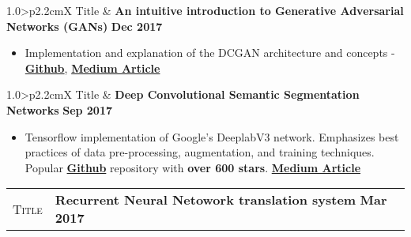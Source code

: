 \documentclass[9pt, a4paper, oneside, final]{scrartcl} %
\newcommand{\gray}{\rowcolor[gray]{.90}} %
\begin{document}

\begin{center}
\begin{tabularx}{1.0\linewidth}{>{\raggedleft\scshape}p{2.2cm}X}
\gray Title & \textbf{An intuitive introduction to Generative Adversarial Networks (GANs)} \hfill \textbf{Dec 2017}\\
\end{tabularx}
\end{center}


\begin{itemize}\itemsep1.2pt \parskip0pt 
\item Implementation and explanation of the DCGAN architecture and concepts - \textbf{\href{https://github.com/sthalles/blog-resources/tree/master/dcgan}{Github}}, \textbf{\href{https://medium.com/free-code-camp/an-intuitive-introduction-to-generative-adversarial-networks-gans-7a2264a81394}{Medium Article}} 
\end{itemize}

\begin{center}
\begin{tabularx}{1.0\linewidth}{>{\raggedleft\scshape}p{2.2cm}X}
\gray Title & \textbf{Deep Convolutional Semantic Segmentation Networks} \hfill \textbf{Sep 2017}\\
\end{tabularx}
\end{center}

\begin{itemize}\itemsep1.2pt \parskip0pt 
\item Tensorflow implementation of Google’s DeeplabV3 network. Emphasizes best practices of data pre-processing, augmentation, and training techniques. Popular \textbf{\href{https://github.com/sthalles/deeplab_v3}{Github}} repository with \textbf{over 600 stars}. \textbf{\href{https://medium.com/free-code-camp/diving-into-deep-convolutional-semantic-segmentation-networks-and-deeplab-v3-4f094fa387df?source=friends_link&sk=79233e6fd63ef6ea2578d5577eb00666}{Medium Article}}
\end{itemize}

\begin{center}
\begin{tabularx}{1.0\linewidth}{>{\raggedleft\scshape}p{2.2cm}X}
\gray Title & \textbf{Recurrent Neural Netowork translation system} \hfill \textbf{Mar 2017}\\
\end{tabularx}
\end{center}
\end{document}

